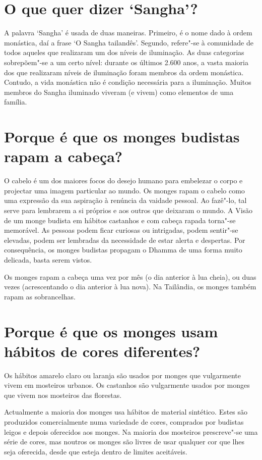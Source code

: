 \section{O que quer dizer `Sangha'?}

A palavra `Sangha' é usada de duas maneiras. Primeiro, é o nome dado à
ordem monástica, daí a frase `O Sangha tailandês'. Segundo, refere"-se à
comunidade de todos aqueles que realizaram um dos níveis de iluminação.
As duas categorias sobrepõem"-se a um certo nível: durante os últimos
2.600 anos, a vasta maioria dos que realizaram níveis de iluminação
foram membros da ordem monástica. Contudo, a vida monástica não é
condição necessária para a iluminação. Muitos membros do Sangha
iluminado viveram (e vivem) como elementos de uma família.

\section{Porque é que os monges budistas rapam a cabeça?}

O cabelo é um dos maiores focos do desejo humano para embelezar o corpo
e projectar uma imagem particular ao mundo. Os monges rapam o cabelo
como uma expressão da sua aspiração à renúncia da vaidade pessoal. Ao
fazê"-lo, tal serve para lembrarem a si próprios e aos outros que
deixaram o mundo. A Visão de um monge budista em hábitos castanhos e com
cabeça rapada torna"-se memorável. As pessoas podem ficar curiosas ou
intrigadas, podem sentir"-se elevadas, podem ser lembradas da necessidade
de estar alerta e despertas. Por consequência, os monges budistas
propagam o Dhamma de uma forma muito delicada, basta serem vistos.

Os monges rapam a cabeça uma vez por mês (o dia anterior à lua cheia),
ou duas vezes (acrescentando o dia anterior à lua nova). Na Tailândia,
os monges também rapam as sobrancelhas.

\section{Porque é que os monges usam hábitos de cores diferentes?}

Os hábitos amarelo claro ou laranja são usados por monges que
vulgarmente vivem em mosteiros urbanos. Os castanhos são vulgarmente
usados por monges que vivem nos mosteiros das florestas.

Actualmente a maioria dos monges usa hábitos de material sintético.
Estes são produzidos comercialmente numa variedade de cores, comprados
por budistas leigos e depois oferecidos aos monges. Na maioria dos
mosteiros prescreve"-se uma série de cores, mas noutros os monges são
livres de usar qualquer cor que lhes seja oferecida, desde que esteja
dentro de limites aceitáveis.

